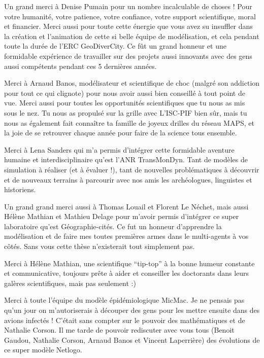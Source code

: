 
Un grand merci à Denise Pumain pour un nombre incalculable de choses ! Pour votre humanité, votre patience, votre confiance, votre support scientifique, moral et financier. Merci aussi pour toute cette énergie que vous avez su insuffler dans la création et l'animation de cette si belle équipe de modélisation, et cela pendant toute la durée de l'ERC GeoDiverCity. Ce fût un grand honneur et une formidable expérience de travailler sur des projets aussi innovants avec des gens aussi compétents pendant ces 5 dernières années.   

\medskip

Merci à Arnaud Banos, modélisateur et scientifique de choc (malgré son addiction pour tout ce qui clignote) pour nous avoir aussi bien conseillé à tout point de vue. Merci aussi pour toutes les opportunités scientifiques que tu nous as mis sous le nez. Tu nous as propulsé sur la grille avec L’ISC-PIF bien sûr, mais tu nous as également fait connaître ta famille de joyeux drilles du réseau MAPS, et la joie de se retrouver chaque année pour faire de la science tous ensemble. 

\medskip
Merci à Lena Sanders qui m'a permis d’intégrer cette formidable aventure humaine et interdisciplinaire qu’est l’ANR TransMonDyn. Tant de modèles de simulation à réaliser (et à évaluer !), tant de nouvelles problématiques à découvrir et de nouveaux terrains à parcourir avec nos amis les archéologues, linguistes et historiens.

\medskip
Un grand grand merci aussi à Thomas Louail et Florent Le Néchet, mais aussi Hélène Mathian et Mathieu Delage pour m’avoir permis d’intégrer ce super laboratoire qu’est Géographie-cités. Ce fut un honneur d’apprendre la modélisation et de faire mes toutes premières armes dans le multi-agents à vos côtés. Sans vous cette thèse n’existerait tout simplement pas.

\medskip
Merci à Hélène Mathian, une scientifique “tip-top” à la bonne humeur constante et communicative, toujours prête à aider et conseiller les doctorants dans leurs galères scientifiques, mais pas seulement :) 

\medskip
Merci à toute l’équipe du modèle épidémiologique MicMac. Je ne pensais pas qu’un jour on m’autoriserais à découper des gens pour les mettre ensuite dans des avions infectés ! C’était sans compter sur le pouvoir des mathématiques et de Nathalie Corson. Il me tarde de pouvoir rediscuter avec vous tous (Benoit Gaudou, Nathalie Corson, Arnaud Banos et Vincent Laperrière) des évolutions de ce super modèle Netlogo.

